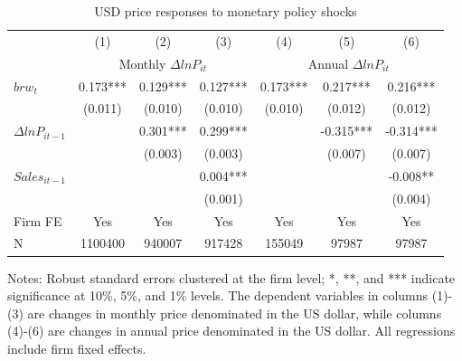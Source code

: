 \begin{table}[htbp]
    \centering
    \caption{USD price responses to monetary policy shocks}
    \begin{threeparttable}
    \begin{tabular}{lcccccc}
        \toprule
        & (1)   & (2)   & (3)   & (4)   & (5)   & (6) \\
        & \multicolumn{3}{c}{Monthly $\Delta ln P_{it}$} & \multicolumn{3}{c}{Annual $\Delta ln P_{it}$}  \\
        \midrule
        $brw_t$   & 0.173*** & 0.129*** & 0.127*** & 0.173*** & 0.217*** & 0.216*** \\
              & (0.011) & (0.010) & (0.010) & (0.010) & (0.012) & (0.012) \\
        $\Delta ln P_{it-1}$ &       & 0.301*** & 0.299*** &       & -0.315*** & -0.314*** \\
              &       & (0.003) & (0.003) &       & (0.007) & (0.007) \\
        $Sales_{it-1}$ &       &       & 0.004*** &       &      & -0.008**\\
              &       &       & (0.001) &       &       & (0.004)\\
        Firm FE & Yes   & Yes   & Yes   & Yes   & Yes   & Yes \\
        N     & 1100400 & 940007 & 917428 & 155049 & 97987 & 97987 \\
        \bottomrule
    \end{tabular}
        \begin{tablenotes}
            \footnotesize
            \item Notes: Robust standard errors clustered at the firm level;  *, **, and *** indicate significance at 10\%, 5\%, and 1\% levels. The dependent variables in columns (1)-(3) are changes in monthly price denominated in the US dollar, while columns (4)-(6) are changes in annual price denominated in the US dollar. All regressions include firm fixed effects.
	\end{tablenotes}
    \end{threeparttable}
    \label{tab.USD}
\end{table}

